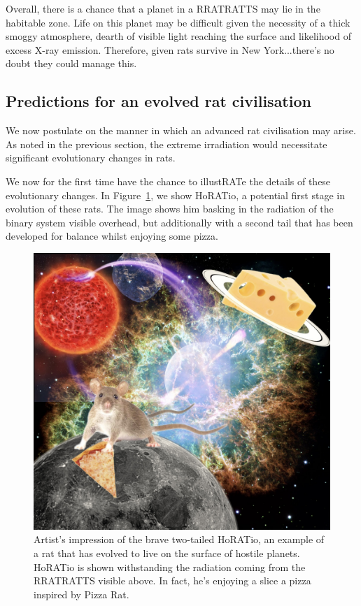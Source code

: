 \documentclass[twocolumn, twocolappendix]{aastex631}
\newcommand{\binaryRAT}{RRATRATTS\xspace}
\begin{document}
Overall, there is a chance that a planet in a \binaryRAT may lie in the habitable zone. Life on this planet may be difficult given the necessity of a thick smoggy atmosphere, dearth of visible light reaching the surface and likelihood of excess X-ray emission. Therefore, given rats survive in New York...there's no doubt they could manage this.

\subsection{Predictions for an evolved rat civilisation}

We now postulate on the manner in which an advanced rat civilisation may arise. As noted in the previous section, the extreme irradiation would necessitate significant evolutionary changes in rats.

We now for the first time have the chance to illustRATe the details of these evolutionary changes. In Figure~\ref{fig:horatio}, we show HoRATio, a potential first stage in evolution of these rats. The image shows him basking in the radiation of the binary system visible overhead, but additionally with a second tail that has been developed for balance whilst enjoying some pizza.

\begin{figure}
    \centering
    \includegraphics[width=\columnwidth]{paper/figures/horatio_updated.jpg}
    \caption{Artist's impression of the brave two-tailed HoRATio, an example of a rat that has evolved to live on the surface of hostile planets. HoRATio is shown withstanding the radiation coming from the \binaryRAT visible above. In fact, he's enjoying a slice a pizza inspired by Pizza Rat.}
    \label{fig:horatio}
\end{figure}
\end{document}
